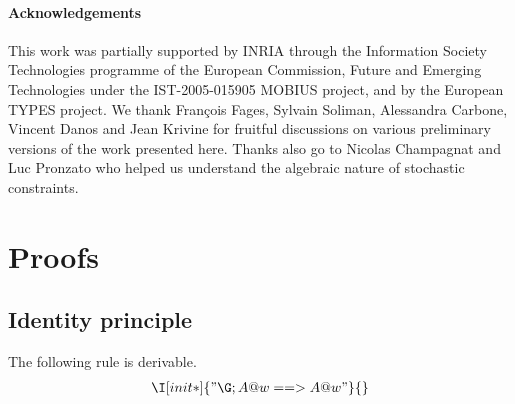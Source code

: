 \documentclass{article}
\begin{document}
\paragraph{Acknowledgements}

This work was partially supported by INRIA through the Information Society Technologies
programme of the European Commission, Future and Emerging Technologies under the
IST-2005-015905 MOBIUS project, and by the European TYPES project.
We thank Fran\c{c}ois Fages, Sylvain Soliman, Alessandra Carbone, Vincent Danos
and Jean Krivine for fruitful discussions on various preliminary versions of the
work presented here.
Thanks also go to Nicolas Champagnat and Luc Pronzato who helped us understand 
the algebraic nature of stochastic constraints.

\bgroup \small


\egroup


\clearpage
\appendix

\section{Proofs}
\label{sec:proofs}

\subsection{Identity principle}
\label{sec:proofs.identity}

\begin{thm} The following rule is derivable.
  \begin{gather*}
    \I[init*]{"\G ; A @ w ==> A @ w"}{}
  \end{gather*}
\end{thm}
\end{document}
